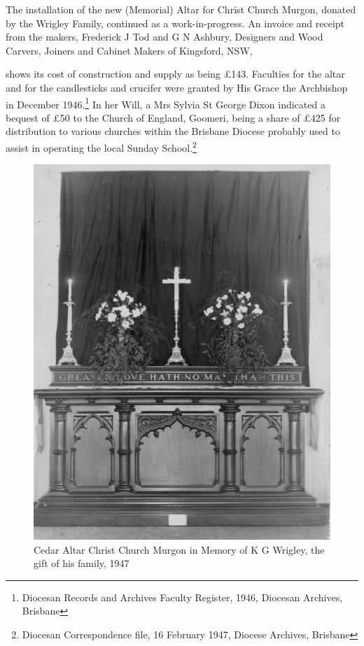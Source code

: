 The installation of the new (Memorial) Altar for Christ Church Murgon, donated by the Wrigley Family, continued as a work-in-progress. An invoice and receipt from the makers, Frederick J Tod and G N Ashbury, Designers and Wood Carvers, Joiners and Cabinet Makers of Kingsford, NSW,



shows its cost of construction and supply as being \pounds143. Faculties for the altar and for the candlesticks and crucifer were granted by His Grace the Archbishop in December 1946.\footnote{Diocesan Records and Archives Faculty Register, 1946, Diocesan Archives, Brisbane} In her Will, a Mrs Sylvia St George Dixon indicated a bequest of \pounds50 to the Church of England, Goomeri, being a share of \pounds425 for distribution to various churches within the Brisbane Diocese probably used to assist in operating the local Sunday School.\footnote{Diocesan Correspondence file, 16 February 1947, Diocese Archives, Brisbane}








\begin{figure}
\begin{center}
\includegraphics[width=1.\linewidth,center]{../images/cedarAltar1947.jpg}
\caption{Cedar Altar Christ Church Murgon in Memory of K G Wrigley, the gift of his family, 1947}
\end{center}
\end{figure}




